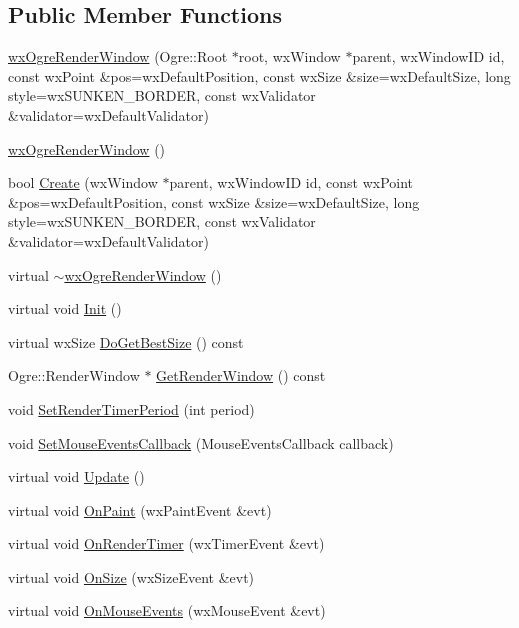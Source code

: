 \subsection*{Public Member Functions}
\begin{DoxyCompactItemize}
\item 
\mbox{\hyperlink{classwx_ogre_render_window_aa1add46adc50ac203ff2b5b07e001b00}{wx\+Ogre\+Render\+Window}} (Ogre\+::\+Root $\ast$root, wx\+Window $\ast$parent, wx\+Window\+ID id, const wx\+Point \&pos=wx\+Default\+Position, const wx\+Size \&size=wx\+Default\+Size, long style=wx\+S\+U\+N\+K\+E\+N\+\_\+\+B\+O\+R\+D\+ER, const wx\+Validator \&validator=wx\+Default\+Validator)
\item 
\mbox{\hyperlink{classwx_ogre_render_window_a4fcac7c29977693be0f73a462bc68134}{wx\+Ogre\+Render\+Window}} ()
\item 
bool \mbox{\hyperlink{classwx_ogre_render_window_addc8dc3f5edfffab2a52e222aab1e08b}{Create}} (wx\+Window $\ast$parent, wx\+Window\+ID id, const wx\+Point \&pos=wx\+Default\+Position, const wx\+Size \&size=wx\+Default\+Size, long style=wx\+S\+U\+N\+K\+E\+N\+\_\+\+B\+O\+R\+D\+ER, const wx\+Validator \&validator=wx\+Default\+Validator)
\item 
virtual \mbox{\hyperlink{classwx_ogre_render_window_ab883308056ab07b1c21c583ddcde1a6e}{$\sim$wx\+Ogre\+Render\+Window}} ()
\item 
virtual void \mbox{\hyperlink{classwx_ogre_render_window_a4cff3f54eed10b38b14aa4c7a8d7a4e3}{Init}} ()
\item 
virtual wx\+Size \mbox{\hyperlink{classwx_ogre_render_window_ac6b5287a3b9abdedfdb3142df79e678e}{Do\+Get\+Best\+Size}} () const
\item 
Ogre\+::\+Render\+Window $\ast$ \mbox{\hyperlink{classwx_ogre_render_window_a36b111b399516bf7397858c5dbd7405c}{Get\+Render\+Window}} () const
\item 
void \mbox{\hyperlink{classwx_ogre_render_window_ad2588b1d44ae75bca36ede1303ff914f}{Set\+Render\+Timer\+Period}} (int period)
\item 
void \mbox{\hyperlink{classwx_ogre_render_window_ad2d0c71f8757ddd48623f8e475100f76}{Set\+Mouse\+Events\+Callback}} (Mouse\+Events\+Callback callback)
\item 
virtual void \mbox{\hyperlink{classwx_ogre_render_window_a00c18e5b03975a630b512ebf0d4f0764}{Update}} ()
\item 
virtual void \mbox{\hyperlink{classwx_ogre_render_window_ae3394f8187616e6aa310195001632359}{On\+Paint}} (wx\+Paint\+Event \&evt)
\item 
virtual void \mbox{\hyperlink{classwx_ogre_render_window_a4065f34eb3af7813f1b79ee6ba0d269f}{On\+Render\+Timer}} (wx\+Timer\+Event \&evt)
\item 
virtual void \mbox{\hyperlink{classwx_ogre_render_window_a2ed6d1321e36951bc9c9bcb42ca1a32e}{On\+Size}} (wx\+Size\+Event \&evt)
\item 
virtual void \mbox{\hyperlink{classwx_ogre_render_window_a75627af5e05691526b99524af5feaa5e}{On\+Mouse\+Events}} (wx\+Mouse\+Event \&evt)
\end{DoxyCompactItemize}
